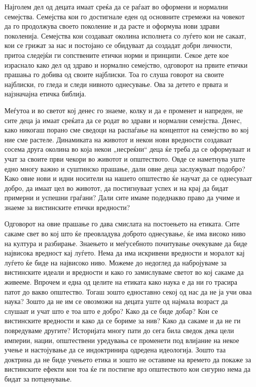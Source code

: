 \documentclass[12pt,a4paper]{article}
\begin{document}
Најголем дел од децата имаат среќа да се раѓаат во оформени
и нормални семејства. Семејства кои го достигнале еден од основните стремежи
на човекот да го продолжува своето поколение и да расте и оформува нови здрави
поколенија. Семејства кои создаваат околина исполнета со луѓето кои не сакаат,
кои се грижат за нас и постојано се обидуваат да создадат добри личности, притоа
следејќи ги сопствените етички норми и принципи. Секое дете кое израснало како
дел од здраво и нормално семејство, одговорот на првите етички прашања го добива
од своите најблиски. Тоа го слуша говорот на своите најблиски, го гледа и следи
нивното однесување. Ова за детето е првата и најзначајна етичка библија.

Меѓутоа и во светот кој денес го знаеме, колку и да е променет и напреден, не
сите деца ја имаат среќата да се родат во здрави и нормални семејства. Денес,
како никогаш порано сме сведоци на распаѓање на концептот на семејство во кој
ние сме растеле. Динамиката на животот и некои нови вредности создаваат сосема
друга околина во која некои „несреќни“ деца ќе треба да се оформуваат и учат за
своите први чекори во животот и општеството. Овде се наметнува уште едно многу
важно и суштинско прашање, дали овие деца заслужуваат подобро? Како овие нови и
идни носители на нашето општество ќе научат да се однесуваат добро, да имаат цел
во животот, да постигнуваат успех и на крај да бидат примерни и успешни граѓани?
Дали сите имаме подеднакво право да учиме и знаеме за вистинските етички вредности? 

Одговорот на овие прашање го дава смислата на постоењето на етиката. Сите сакаме
свет во кој што ќе преовладува доброто однесување, ќе има високо ниво на култура
и разбирање. Знаењето и меѓусебното почитување очекуваме да биде највисока
вредност кај луѓето. Нема да има искривени вредности и моралот кај луѓето ќе
биде на највисоко ниво. Можеме до недоглед да набројуваме за вистинските идеали
и вредности и како го замислуваме светот во кој сакаме да живееме. Впрочем и
една од целите на етиката како наука е да ни го трасира патот до вакво
општество. Тогаш зошто едноставно секој од нас да не ја учи оваа наука? Зошто да
не им се овозможи на децата уште од најмала возраст да слушаат и учат што е тоа
што е добро? Како да се биде добар? Кои се вистинските вредности и како да се
бориме за нив? Како да сакаме и да не ги повредуваме другите? Историјата
многу пати до сега била сведок дека цели империи, нации, општествени уредувања
се променети под влијание на некое учење и настојување да се индоктринира
одредена идеологија. Зошто таа доктрина да не биде учењето етика и зошто
не оставиме на времето да покаже за вистинските ефекти кои тоа ќе ги постигне
врз општеството кои сигурно нема да бидат за потценување.
\end{document}
